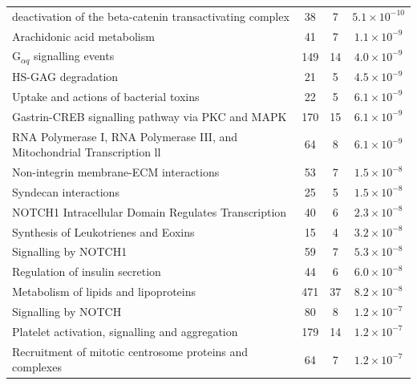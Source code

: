 \begin{table}[!hp]
{\begin{threeparttable}
\begin{tabular}{lccc}
  \rowcolor{Cluster_Red!15} 
  deactivation of the beta-catenin transactivating complex &  38 &   7 & $5.1 \times 10^{-10}$ \\ 
  \rowcolor{Cluster_Red!20} 
  Arachidonic acid metabolism &  41 &   7 & $1.1 \times 10^{-9}$ \\ 
  \rowcolor{Cluster_Red!15} 
  G$_{\alpha q}$ signalling events & 149 &  14 & $4.0 \times 10^{-9}$ \\ 
  \rowcolor{Cluster_Red!20} 
  HS-GAG degradation &  21 &   5 & $4.5 \times 10^{-9}$ \\ 
  \rowcolor{Cluster_Red!15} 
  Uptake and actions of bacterial toxins &  22 &   5 & $6.1 \times 10^{-9}$ \\ 
  \rowcolor{Cluster_Red!20} 
  Gastrin-CREB signalling pathway via PKC and MAPK & 170 &  15 & $6.1 \times 10^{-9}$ \\ 
  \rowcolor{Cluster_Red!15} 
  \acrshort{RNA} Polymerase I, \acrshort{RNA} Polymerase III, and Mitochondrial Transcription \textcolor{Cluster_Red!15}{ll}  &  64 &   8 & $6.1 \times 10^{-9}$ \\ 
  \rowcolor{Cluster_Red!20} 
  Non-integrin membrane-ECM interactions &  53 &   7 & $1.5 \times 10^{-8}$ \\ 
  \rowcolor{Cluster_Red!15} 
  Syndecan interactions &  25 &   5 & $1.5 \times 10^{-8}$ \\ 
  \rowcolor{Cluster_Red!20} 
  NOTCH1 Intracellular Domain Regulates Transcription &  40 &   6 & $2.3 \times 10^{-8}$ \\ 
  \rowcolor{Cluster_Red!15} 
  Synthesis of Leukotrienes and Eoxins &  15 &   4 & $3.2 \times 10^{-8}$ \\ 
  \rowcolor{Cluster_Red!20} 
  Signalling by NOTCH1 &  59 &   7 & $5.3 \times 10^{-8}$ \\ 
  \rowcolor{Cluster_Red!15} 
  Regulation of insulin secretion &  44 &   6 & $6.0 \times 10^{-8}$ \\ 
  \rowcolor{Cluster_Red!20} 
  Metabolism of lipids and lipoproteins & 471 &  37 & $8.2 \times 10^{-8}$ \\ 
  \rowcolor{Cluster_Red!15} 
  Signalling by NOTCH &  80 &   8 & $1.2 \times 10^{-7}$ \\ 
  \rowcolor{Cluster_Red!20} 
  Platelet activation, signalling and aggregation & 179 &  14 & $1.2 \times 10^{-7}$ \\ 
  \rowcolor{Cluster_Red!15} 
  Recruitment of mitotic centrosome proteins and complexes &  64 &   7 & $1.2 \times 10^{-7}$ \\ 

\end{tabular}
\end{threeparttable}}
\end{table}
